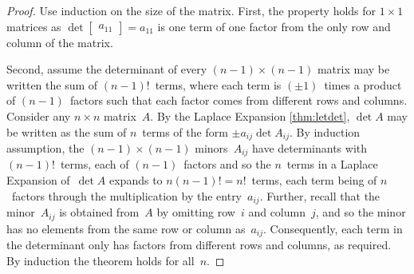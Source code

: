 \begin{proof} 
Use induction on the size of the matrix.
First, the property holds for \(1\times 1\) matrices as \(\det\begin{bmatrix} a_{11} \end{bmatrix}=a_{11}\) is one term of one factor from the only row and column of the matrix.

Second, assume the determinant of every \((n-1)\times (n-1)\) matrix may be written the sum of \((n-1)!\)~terms, where each term is \((\pm1)\)~times a product of \((n-1)\)~factors such that each factor comes from different rows and columns.
Consider any \(n\times n\) matrix~\(A\).
By the Laplace Expansion \cref{thm:letdet}, \(\det A\) may be written as the sum of \(n\)~terms of the form \(\pm a_{ij}\det A_{ij}\).
By induction assumption, the \((n-1)\times(n-1)\) minors~\(A_{ij}\) have determinants with \((n-1)!\)~terms, each of \((n-1)\)~factors and so the \(n\)~terms in a Laplace Expansion of~\(\det A\) expands to \(n(n-1)!=n!\)~terms, each term being of \(n\)~factors through the multiplication by the entry~\(a_{ij}\).
Further, recall that the minor~\(A_{ij}\) is obtained from~\(A\) by omitting row~\(i\) and column~\(j\), and so the minor has no elements from the same row or column as~\(a_{ij}\).
Consequently, each term in the determinant only has factors from different rows and columns, as required.
By induction the theorem holds for all~\(n\).
\end{proof}





\begin{comment}
\nakos{} has an interesting section on using determinants to fit some interesting curves, and other determinant uses: such material could go here.
\end{comment}






\sectionExercises




